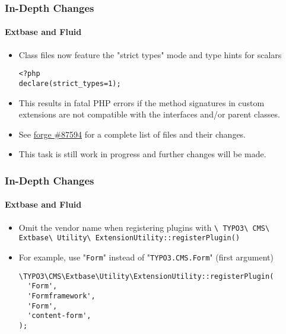 \begin{frame}[fragile]
	\frametitle{In-Depth Changes}
	\framesubtitle{Extbase and Fluid}

	\lstset{basicstyle=\smaller\ttfamily}

	\begin{itemize}
		\item Class files now feature the "strict types" mode and type hints for scalars
\begin{lstlisting}
<?php
declare(strict_types=1);
\end{lstlisting}

		\item This results in fatal PHP errors if the method signatures in custom
			extensions are not compatible with the interfaces and/or parent classes.

		\item See \href{https://forge.typo3.org/issues/87594}{forge \#87594}
			for a complete list of files and their changes.

		\item This task is still work in progress and further changes will be made.

	\end{itemize}

\end{frame}


\begin{frame}[fragile]
	\frametitle{In-Depth Changes}
	\framesubtitle{Extbase and Fluid}

	\lstset{basicstyle=\smaller\ttfamily}

	\begin{itemize}
		\item Omit the vendor name when registering plugins with\newline
			\smaller
				\texttt{\textbackslash
					TYPO3\textbackslash
					CMS\textbackslash
					Extbase\textbackslash
					Utility\textbackslash
					ExtensionUtility::registerPlugin()}
			\normalsize

		\item For example, use "\texttt{Form}" instead of "\texttt{TYPO3.CMS.Form}"\newline
			\small(first argument)\normalsize
\begin{lstlisting}
\TYPO3\CMS\Extbase\Utility\ExtensionUtility::registerPlugin(
  'Form',
  'Formframework',
  'Form',
  'content-form',
);
\end{lstlisting}

	\end{itemize}

\end{frame}

